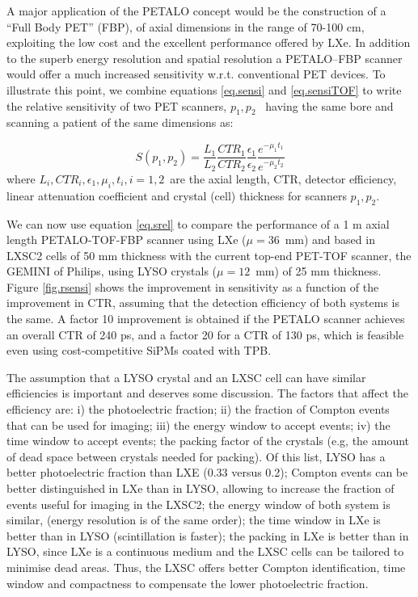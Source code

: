 A major application of the PETALO concept would be the construction of a ``Full Body PET'' (FBP), of axial dimensions in the range of 70-100 cm, exploiting the low cost and the excellent performance offered by LXe. In addition to the superb energy resolution and spatial resolution a PETALO--FBP scanner would offer a much increased sensitivity w.r.t. conventional PET devices. To illustrate this point, we combine equations \ref{eq.sensi} and \ref{eq.sensiTOF} to write the relative sensitivity of two PET scanners, $p_1,p_2$~ having the same bore and scanning a patient of the same dimensions as:

\begin{equation}
S(p_1,p_2) = \frac{L_1} {L_2}\frac{CTR_1} {CTR_2}\frac{\epsilon_1} {\epsilon_2}\frac{e^{-\mu_1 t_1}} {e^{-\mu_2 t_2}}
\label{eq.srel}
\end{equation}
%
where $L_i,CTR_i,\epsilon_1,\mu_i,t_i, i=1,2$~are the axial length, CTR, detector efficiency, linear attenuation coefficient and crystal (cell) thickness for scanners $p_1,p_2$.

We can now use equation \ref{eq.srel} to compare the performance of a 1 m axial length PETALO-TOF-FBP scanner using LXe ($\mu = 36$~mm) and based in LXSC2 cells of 50 mm thickness with the current top-end PET-TOF scanner, the GEMINI of Philips, using LYSO crystals ($\mu = 12$~mm) of 25 mm thickness. Figure \ref{fig.rsensi} shows the improvement in sensitivity as a function of the improvement in CTR, assuming that the detection efficiency of both systems is the same. A factor 10 improvement is obtained if the PETALO scanner achieves an overall CTR of 240 ps, and a factor 20 for a CTR of 130 ps, which is feasible even using cost-competitive SiPMs coated with TPB. 

The assumption that a LYSO crystal and an LXSC cell can have similar efficiencies is important and deserves some discussion. The factors that affect the efficiency are: i) the photoelectric fraction; ii) the fraction of Compton events that can be used for imaging; iii) the energy window to accept events; iv) the time window to accept events; the packing factor of the crystals (e.g, the amount of dead space between crystals needed for packing). Of this list, LYSO has a better photoelectric fraction than LXE (0.33 versus 0.2); Compton events can be better distinguished in LXe than in LYSO, allowing to increase the fraction of events useful for imaging in the LXSC2; the energy window of both system is similar, (energy resolution is of the same order); the time window in LXe is better than in LYSO (scintillation is faster); the packing in LXe is better than in LYSO, since LXe is a continuous medium and the LXSC cells can be tailored to minimise dead areas. Thus, the LXSC offers better Compton identification, time window and compactness to compensate the lower photoelectric fraction. 
%

